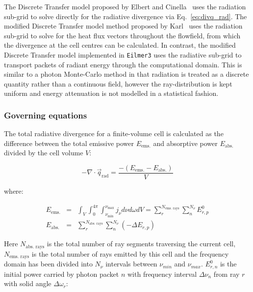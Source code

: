 \par

The Discrete Transfer model proposed by Elbert and Cinella~\cite{elbert_cinnella} uses the radiation sub-grid to solve directly for the radiative divergence via Eq.~\ref{eq:divq_rad}.
The modified Discrete Transfer model method proposed by Karl~\cite{karl2001} uses the radiation sub-grid to solve for the heat flux vectors throughout the flowfield, from which the divergence at the cell centres can be calculated.
In contrast, the modified Discrete Transfer model implemented in \texttt{Eilmer3} uses the radiative sub-grid to transport packets of radiant energy through the computational domain.
This is similar to a photon Monte-Carlo method in that radiation is treated as a discrete quantity rather than a continuous field, however the ray-distribution is kept uniform and energy attenuation is not modelled in a statistical fashion.

\subsubsection{Governing equations}

The total radiative divergence for a finite-volume cell is calculated as the difference between the total emissive power $E_{\text{ems.}}$ and absorptive power $E_{\text{abs.}}$ divided by the cell volume $V$:

\begin{equation}
 - \nabla \cdot \vec{q}_\text{rad} = \frac{ - \left ( E_{\text{ems.}} - E_{\text{abs.}} \right ) }{V}
 \label{eq:my_divq}
\end{equation}

\noindent where:

\begin{eqnarray}
 E_{\text{ems.}} &=& \int_{V} \int_{0}^{{4\pi}} \int_{\nu_{\text{min}}}^{\nu_{\text{max}}} j_{\nu} d\nu d\omega dV = \sum_{r}^{N_{\text{ems. rays}}} \sum_{n}^{N_{\nu}} E_{r,p}^0 \label{eq:E_emission} \\
 E_{\text{abs.}} &=& \sum_{r}^{N_{\text{abs. rays}}} \sum_{n}^{N_{\nu}} \left ( - \Delta E_{r,p} \right ) \label{eq:E_absorption} 
\end{eqnarray}

\noindent Here $N_{\text{abs. rays}}$ is the total number of ray segments traversing the current cell, $N_{\text{ems. rays}}$ is the total number of rays emitted by this cell and the frequency domain has been divided into $N_{\nu}$ intervals between $\nu_{min}$ and $\nu_{max}$. 
$E_{r,n}^0$ is the initial power carried by photon packet $n$ with frequency interval $\Delta \nu_{n}$ from ray $r$ with solid angle $\Delta \omega_{r}$:


